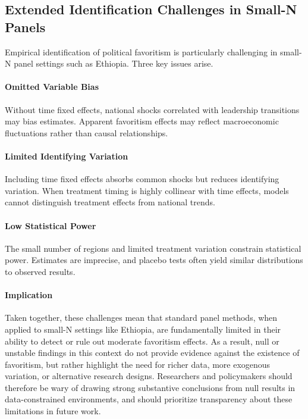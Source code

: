 \documentclass[12pt,a4paper]{article}
\begin{document}
\subsection{Extended Identification Challenges in Small-N Panels}

Empirical identification of political favoritism is particularly challenging in small-N panel settings such as Ethiopia. Three key issues arise.

\paragraph{Omitted Variable Bias}

Without time fixed effects, national shocks correlated with leadership transitions may bias estimates. Apparent favoritism effects may reflect macroeconomic fluctuations rather than causal relationships.

\paragraph{Limited Identifying Variation}

Including time fixed effects absorbs common shocks but reduces identifying variation. When treatment timing is highly collinear with time effects, models cannot distinguish treatment effects from national trends.

\paragraph{Low Statistical Power}

The small number of regions and limited treatment variation constrain statistical power. Estimates are imprecise, and placebo tests often yield similar distributions to observed results.


\paragraph{Implication}

Taken together, these challenges mean that standard panel methods, when applied to small-N settings like Ethiopia, are fundamentally limited in their ability to detect or rule out moderate favoritism effects. As a result, null or unstable findings in this context do not provide evidence against the existence of favoritism, but rather highlight the need for richer data, more exogenous variation, or alternative research designs. Researchers and policymakers should therefore be wary of drawing strong substantive conclusions from null results in data-constrained environments, and should prioritize transparency about these limitations in future work.
\end{document}
